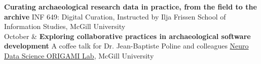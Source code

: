 \documentclass[11pt, a4paper]{article}
\newcommand{\Year}[1]{\fontsize{9pt}{0}\selectfont #1}
\begin{document}
\begin{EntriesTable}
  \textbf{Curating archaeological research data in practice, from the field to the archive}
  \newline
  INF 649: Digital Curation, Instructed by Ilja Frissen
  \newline
  School of Information Studies, McGill University
  \\
\Year{2024 \newline\footnotesize{October}} &
  \textbf{Exploring collaborative practices in archaeological software development}
  \newline
  A coffee talk for Dr. Jean-Baptiste Poline and colleagues
  \newline
  \href{https://neurodatascience.github.io/}{Neuro Data Science ORIGAMI Lab}, McGill University
\end{EntriesTable}
\end{document}
